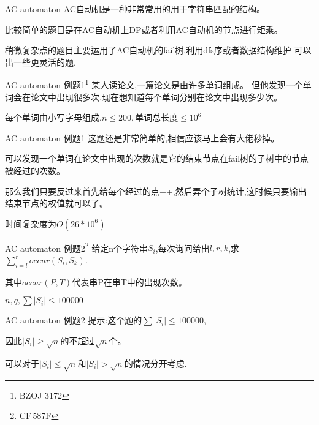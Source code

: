 \documentclass[10pt]{beamer}
\begin{document}
	\begin{frame}{AC automaton}
		AC自动机是一种非常常用的用于字符串匹配的结构。\pause

		\vspace{3ex}

		比较简单的题目是在AC自动机上DP或者利用AC自动机的节点进行矩乘。

		\vspace{3ex}

		稍微复杂点的题目主要运用了AC自动机的fail树,利用dfs序或者数据结构维护
		可以出一些更灵活的题.
	\end{frame}
	\begin{frame}{AC automaton 例题1\footnote{BZOJ 3172}}
		某人读论文,一篇论文是由许多单词组成。
		但他发现一个单词会在论文中出现很多次,现在想知道每个单词分别在论文中出现多少次。

		每个单词由小写字母组成,$n \leq 200 ,\text{单词总长度}\leq 10^6$
	\end{frame}
	\begin{frame}{AC automaton 例题1}
		这题还是非常简单的,相信应该马上会有大佬秒掉。

		可以发现一个单词在论文中出现的次数就是它的结束节点在fail树的子树中的节点被经过的次数。\pause
		

		那么我们只要反过来首先给每个经过的点++,然后弄个子树统计,这时候只要输出结束节点的权值就可以了。

		时间复杂度为$O(26*10^6)$
	\end{frame}
	\begin{frame}{AC automaton 例题2\footnote{CF$\,$587F}}
		给定n个字符串$S_i$,每次询问给出$l,r,k$,求$\sum_{i=l}^r occur(S_i,S_k)$.

		\vspace{2ex}

		其中$occur(P,T)$代表串P在串T中的出现次数。

		\vspace{2ex}

		$n,q,\sum|S_i| \leq 100000$
	\end{frame}
	\begin{frame}{AC automaton 例题2}
		提示:这个题的$\sum|S_i| \leq 100000$,

		\vspace{2ex}

		因此$|S_i| \geq \sqrt{n}$的不超过$\sqrt{n}$个。

		\vspace{2ex}

		可以对于$|S_i|\leq \sqrt{n}$和$|S_i|> \sqrt{n}$的情况分开考虑.
	\end{frame}
\end{document}
